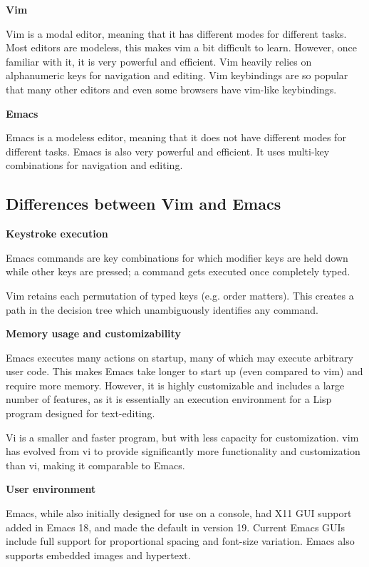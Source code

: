 \textbf{Vim}

Vim is a modal editor, meaning that it has different modes for different tasks.
Most editors are modeless, this makes vim a bit difficult to learn.
However, once familiar with it, it is very powerful and efficient.
Vim heavily relies on alphanumeric keys for navigation and editing.
Vim keybindings are so popular that many other editors and even
some browsers
have vim-like keybindings.

\textbf{Emacs}

Emacs is a modeless editor, meaning that it does not have different modes for different tasks.
Emacs is also very powerful and efficient.
It uses multi-key combinations for navigation and editing.

\subsection{Differences between Vim and Emacs}
\textbf{Keystroke execution}

Emacs commands are key combinations for which modifier keys are held down while other keys are pressed; a command gets executed once completely typed.

Vim retains each permutation of typed keys (e.g. order matters). This creates a path in the decision tree which unambiguously identifies any command.

\textbf{Memory usage and customizability}

Emacs executes many actions on startup, many of which may execute arbitrary user code. This makes Emacs take longer to start up (even compared to vim) and require more memory. However, it is highly customizable and includes a large number of features, as it is essentially an execution environment for a Lisp program designed for text-editing.

Vi is a smaller and faster program, but with less capacity for customization. vim has evolved from vi to provide significantly more functionality and customization than vi, making it comparable to Emacs.

\textbf{User environment}

Emacs, while also initially designed for use on a console, had X11 GUI support added in Emacs 18, and made the default in version 19. Current Emacs GUIs include full support for proportional spacing and font-size variation. Emacs also supports embedded images and hypertext.

